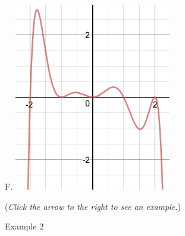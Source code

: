 \documentclass{ximera}
\begin{document}
\begin{question}
\begin{center}
\begin{expandable}
\begin{expandable}
\begin{multicols}{3}
\begin{center}
F. \includegraphics[scale=0.25]{Graph6}
\end{center}
\end{multicols}

\begin{multipleChoice}
\end{multipleChoice}
\begin{flushright}
{\color{blue}(\emph{Click the arrow to the right to see an example.})}
\end{flushright}
\begin{expandable}
Example 2
\end{expandable}
\end{expandable}
\end{expandable}
\end{center}
\end{question}
\end{document}
